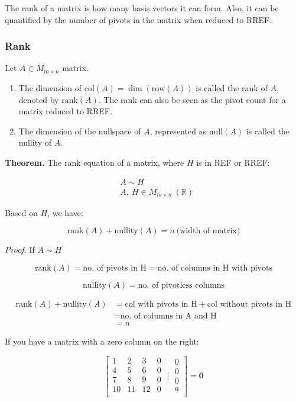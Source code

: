 \documentclass[
]{article}
\begin{document}
The rank of a matrix is how many basis vectors it can form. Also, it can
be quantified by the number of pivots in the matrix when reduced to
RREF.


\subsubsection{Rank}

Let $A \in M_{m \times n}$ matrix.

\begin{enumerate}
\def\labelenumi{\arabic{enumi}.}
\item
  The dimension of $\text{col}(A) = \dim\left( \text{row}(A) \right)$
  is called the rank of $A$, denoted by $\text{rank}(A)$. The rank
  can also be seen as the pivot count for a matrix reduced to RREF.
\item
  The dimension of the nullspace of $A$, represented as
  $\text{null}(A)$ is called the nullity of $A$.
\end{enumerate}

\textbf{Theorem.} The rank equation of a matrix, where $H$ is in REF
or RREF:

\begin{align*}
&A\sim H
 \\
&A,\ H \in M_{m \times n}\ \left( \mathbb{R} \right)
\end{align*}


Based on $H$, we have:

$$\text{rank}(A) + \text{nullity}(A) = n\ \text{(width\ of\ matrix)}$$

\emph{Proof.} If $A\sim H$

$$\text{rank}(A) = \text{no.\ of\ pivots\ in\ H} = \text{no.\ of\ columns\ in\ H\ with\ pivots}$$

$$\text{nullity}(A) = \text{no.\ of\ pivotless\ columns}$$

\begin{align*}
\text{rank}(A) + \text{nullity}(A) &= \text{col\ with\ pivots\ in\ H} + \text{col\ without\ pivots\ in\ H}
 \\
&= \text{no.\ of\ columns\ in\ A\ and\ H}
 \\
&= n
\end{align*}


If you have a matrix with a zero column on the right:

$$\left\lbrack \begin{matrix}
1 & 2 & 3 & 0 \\
4 & 5 & 6 & 0 \\
7 & 8 & 9 & 0 \\
10 & 11 & 12 & 0 \\
\end{matrix}\mid\begin{matrix}
0 \\
0 \\
0 \\
a \\
\end{matrix} \right\rbrack = \mathbf{0}$$
\end{document}
